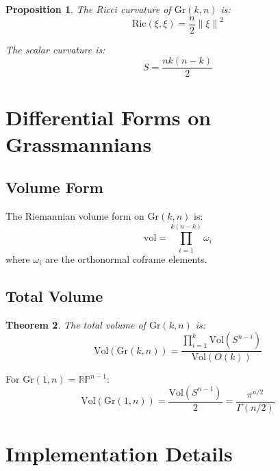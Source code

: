 \documentclass[11pt,a4paper]{article}
\newtheorem{theorem}{Theorem}[section]
\newtheorem{proposition}[theorem]{Proposition}
\newcommand{\Gr}{\mathrm{Gr}}
\newcommand{\norm}[1]{\left\|#1\right\|}
\begin{document}
\begin{proposition}
The Ricci curvature of $\Gr(k,n)$ is:
\begin{equation}
    \mathrm{Ric}(\xi, \xi) = \frac{n}{2} \norm{\xi}^2
\end{equation}

The scalar curvature is:
\begin{equation}
    S = \frac{nk(n-k)}{2}
\end{equation}
\end{proposition}

\section{Differential Forms on Grassmannians}

\subsection{Volume Form}

The Riemannian volume form on $\Gr(k,n)$ is:
\begin{equation}
    \mathrm{vol} = \prod_{i=1}^{k(n-k)} \omega_i
\end{equation}
where $\omega_i$ are the orthonormal coframe elements.

\subsection{Total Volume}

\begin{theorem}
The total volume of $\Gr(k,n)$ is:
\begin{equation}
    \mathrm{Vol}(\Gr(k,n)) = \frac{\prod_{i=1}^{k} \mathrm{Vol}(S^{n-i})}{\mathrm{Vol}(O(k))}
\end{equation}
\end{theorem}

For $\Gr(1,n) = \mathbb{RP}^{n-1}$:
\begin{equation}
    \mathrm{Vol}(\Gr(1,n)) = \frac{\mathrm{Vol}(S^{n-1})}{2} = \frac{\pi^{n/2}}{\Gamma(n/2)}
\end{equation}

\section{Implementation Details}
\end{document}
